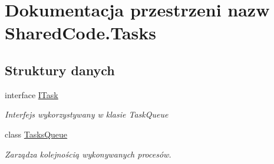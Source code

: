\hypertarget{a00316}{}\section{Dokumentacja przestrzeni nazw Shared\+Code.\+Tasks}
\label{a00316}
\subsection*{Struktury danych}
\begin{DoxyCompactItemize}
\item 
interface \hyperlink{a00032}{I\+Task}
\begin{DoxyCompactList}\small\item\em Interfejs wykorzystywany w klasie Task\+Queue \end{DoxyCompactList}\item 
class \hyperlink{a00069}{Tasks\+Queue}
\begin{DoxyCompactList}\small\item\em Zarządza kolejnością wykonywanych procesów. \end{DoxyCompactList}\end{DoxyCompactItemize}
